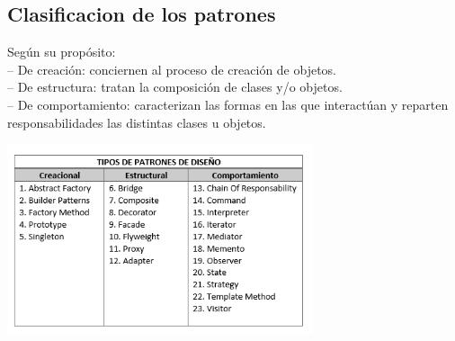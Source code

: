 \documentclass[twoside,twocolumn]{article}
\begin{document}
\subsection{Clasificacion de los patrones}
Según su propósito:\\
– De creación: conciernen al proceso de creación
de objetos.\\
– De estructura: tratan la composición de clases
y/o objetos.\\
– De comportamiento: caracterizan las formas en
las que interactúan y reparten responsabilidades
las distintas clases u objetos.
\begin{center}
    	\includegraphics[width=9cm]{./imagenes/TIPOS.png} 
	\end{center}
\end{document}
